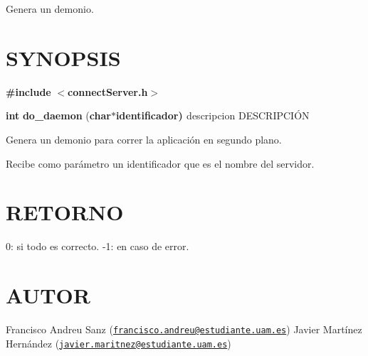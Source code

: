 Genera un demonio.\hypertarget{unknown_case_SYNOPSIS}{}\section{S\-Y\-N\-O\-P\-S\-I\-S}\label{unknown_case_SYNOPSIS}
{\bfseries \#include} {\bfseries $<$connect\-Server.\-h$>$} 

{\bfseries int} {\bfseries do\-\_\-daemon} {\bfseries }({\bfseries char{\bfseries $\ast${\bfseries identificador{\bfseries })}  } } descripcion D\-E\-S\-C\-R\-I\-P\-C\-IÓ\-N

Genera un demonio para correr la aplicación en segundo plano.

Recibe como parámetro un identificador que es el nombre del servidor.\hypertarget{unknown_case_retorno}{}\section{R\-E\-T\-O\-R\-N\-O}\label{unknown_case_retorno}
0\-: si todo es correcto. -\/1\-: en caso de error.\hypertarget{unknown_case_authors}{}\section{A\-U\-T\-O\-R}\label{unknown_case_authors}
Francisco Andreu Sanz (\href{mailto:francisco.andreu@estudiante.uam.es}{\tt francisco.\-andreu@estudiante.\-uam.\-es}) Javier Martínez Hernández (\href{mailto:javier.maritnez@estudiante.uam.es}{\tt javier.\-maritnez@estudiante.\-uam.\-es}) 